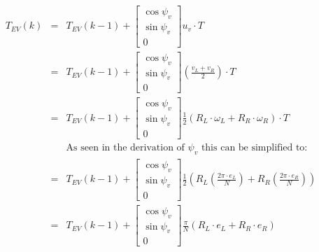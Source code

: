 \documentclass[12pt]{article}
\begin{document}
	\begin{eqnarray}
	{T}_{EV}(k) &=& {T}_{EV}(k-1) + \left[
	\begin{array}{c}
	\cos \psi_v\\
	\sin \psi_v \\
	0
	\end{array}
	\right] u_v \cdot T \nonumber \\
	&=& {T}_{EV}(k-1) + \left[
	\begin{array}{c}
	\cos \psi_v\\
	\sin \psi_v \\
	0
	\end{array}
	\right] \left( \frac{v_L + v_R}{2} \right) \cdot T \nonumber \\
	&=& {T}_{EV}(k-1) + \left[
	\begin{array}{c}
	\cos \psi_v\\
	\sin \psi_v \\
	0
	\end{array}
	\right] \frac{1}{2}(R_L\cdot\omega_L + R_R\cdot\omega_R)\cdot T \nonumber \nonumber \\
	&& \text{As seen in the derivation of $\psi_v$ this can be simplified to:}	\nonumber \\
	&=& {T}_{EV}(k-1) + \left[
	\begin{array}{c}
	\cos \psi_v\\
	\sin \psi_v \\
	0
	\end{array}
	\right] \frac{1}{2}\left(R_L\left(\frac{2\pi \cdot e_L}{N}\right) + R_R\left(\frac{2\pi \cdot e_R}{N}\right)\right) \nonumber  \\
	&=& {T}_{EV}(k-1) + \left[
	\begin{array}{c}
	\cos \psi_v\\
	\sin \psi_v \\
	0
	\end{array}
	\right] \frac{\pi}{N}(R_L\cdot e_L + R_R\cdot e_R) \\
	\nonumber \end{eqnarray}
	 
\end{document}

